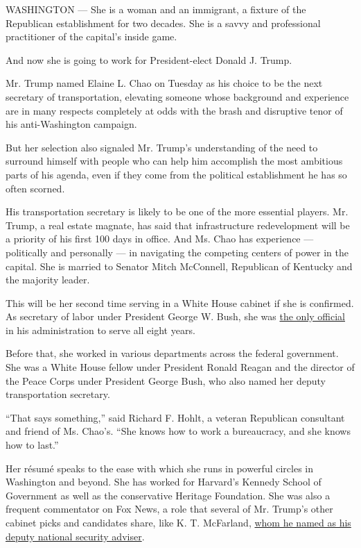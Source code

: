 WASHINGTON --- She is a woman and an immigrant, a fixture of the
Republican establishment for two decades. She is a savvy and
professional practitioner of the capital's inside game.

And now she is going to work for President-elect Donald J. Trump.

Mr. Trump named Elaine L. Chao on Tuesday as his choice to be the next
secretary of transportation, elevating someone whose background and
experience are in many respects completely at odds with the brash and
disruptive tenor of his anti-Washington campaign.

But her selection also signaled Mr. Trump's understanding of the need to
surround himself with people who can help him accomplish the most
ambitious parts of his agenda, even if they come from the political
establishment he has so often scorned.

His transportation secretary is likely to be one of the more essential
players. Mr. Trump, a real estate magnate, has said that infrastructure
redevelopment will be a priority of his first 100 days in office. And
Ms. Chao has experience --- politically and personally --- in navigating
the competing centers of power in the capital. She is married to Senator
Mitch McConnell, Republican of Kentucky and the majority leader.

This will be her second time serving in a White House cabinet if she is
confirmed. As secretary of labor under President George W. Bush, she was
\href{http://www.nytimes.com/2009/01/10/washington/10chao.html}{the only
official} in his administration to serve all eight years.

Before that, she worked in various departments across the federal
government. She was a White House fellow under President Ronald Reagan
and the director of the Peace Corps under President George Bush, who
also named her deputy transportation secretary.

``That says something,'' said Richard F. Hohlt, a veteran Republican
consultant and friend of Ms. Chao's. ``She knows how to work a
bureaucracy, and she knows how to last.''

Her résumé speaks to the ease with which she runs in powerful circles in
Washington and beyond. She has worked for Harvard's Kennedy School of
Government as well as the conservative Heritage Foundation. She was also
a frequent commentator on Fox News, a role that several of Mr. Trump's
other cabinet picks and candidates share, like K. T. McFarland,
\href{http://www.nytimes.com/2016/11/25/us/politics/donald-trump-kt-mcfarland.html}{whom
he named as his deputy national security adviser}.

